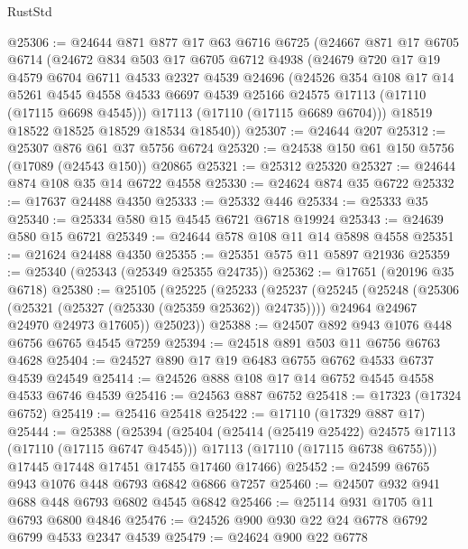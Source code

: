 \begin{lexlean}{RustStd}
\begin{coremodule}
@25306 := @24644
    @871
    @877
    @17
    @63
    @6716
    @6725
    (@24667
      @871
      @17
      @6705
      @6714
      (@24672
        @834
        @503
        @17
        @6705
        @6712
        @4938
        (@24679
          @720
          @17
          @19
          @4579
          @6704
          @6711
          @4533
          @2327
          @4539
          @24696
          (@24526
            @354
            @108
            @17
            @14
            @5261
            @4545
            @4558
            @4533
            @6697
            @4539
            @25166
            @24575
            @17113
            (@17110 (@17115 @6698 @4545)))
          @17113
          (@17110 (@17115 @6689 @6704)))
        @18519
        @18522
        @18525
        @18529
        @18534
        @18540))
@25307 := @24644 @207
@25312 := @25307 @876 @61 @37 @5756 @6724
@25320 := @24538 @150 @61 @150 @5756 (@17089 (@24543 @150)) @20865
@25321 := @25312 @25320
@25327 := @24644 @874 @108 @35 @14 @6722 @4558
@25330 := @24624 @874 @35 @6722
@25332 := @17637 @24488 @4350
@25333 := @25332 @446
@25334 := @25333 @35
@25340 := @25334 @580 @15 @4545 @6721 @6718 @19924
@25343 := @24639 @580 @15 @6721
@25349 := @24644 @578 @108 @11 @14 @5898 @4558
@25351 := @21624 @24488 @4350
@25355 := @25351 @575 @11 @5897 @21936
@25359 := @25340 (@25343 (@25349 @25355 @24735))
@25362 := @17651 (@20196 @35 @6718)
@25380 := @25105
    (@25225
      (@25233
        (@25237
          (@25245
            (@25248 (@25306 (@25321 (@25327 (@25330 (@25359 @25362)) @24735))))
            @24964
            @24967
            @24970
            @24973
            @17605))
        @25023))
@25388 := @24507 @892 @943 @1076 @448 @6756 @6765 @4545 @7259
@25394 := @24518 @891 @503 @11 @6756 @6763 @4628
@25404 := @24527 @890 @17 @19 @6483 @6755 @6762 @4533 @6737 @4539 @24549
@25414 := @24526 @888 @108 @17 @14 @6752 @4545 @4558 @4533 @6746 @4539
@25416 := @24563 @887 @6752
@25418 := @17323 (@17324 @6752)
@25419 := @25416 @25418
@25422 := @17110 (@17329 @887 @17)
@25444 := @25388
    (@25394
      (@25404
        (@25414 (@25419 @25422) @24575 @17113 (@17110 (@17115 @6747 @4545)))
        @17113
        (@17110 (@17115 @6738 @6755)))
      @17445
      @17448
      @17451
      @17455
      @17460
      @17466)
@25452 := @24599 @6765 @943 @1076 @448 @6793 @6842 @6866 @7257
@25460 := @24507 @932 @941 @688 @448 @6793 @6802 @4545 @6842
@25466 := @25114 @931 @1705 @11 @6793 @6800 @4846
@25476 := @24526 @900 @930 @22 @24 @6778 @6792 @6799 @4533 @2347 @4539
@25479 := @24624 @900 @22 @6778

\end{coremodule}
\end{lexlean}
